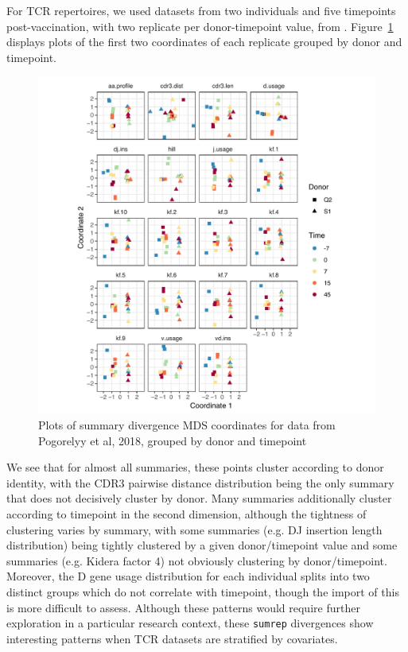 \documentclass{article}
\begin{document}
For TCR repertoires, we used datasets from two individuals and five timepoints post-vaccination, with two replicate per donor-timepoint value, from \cite{Pogorelyy2018-ak}.
Figure~\ref{fig:TCR_MDS} displays plots of the first two coordinates of each replicate grouped by donor and timepoint.
\begin{figure}
    \includegraphics[width=\linewidth]{Figures/tcr_pca.pdf}
    \caption{Plots of summary divergence MDS coordinates for data from Pogorelyy et al, 2018, grouped by donor and timepoint}
    \label{fig:TCR_MDS}
\end{figure}
We see that for almost all summaries, these points cluster according to donor identity, with the CDR3 pairwise distance distribution being the only summary that does not decisively cluster by donor.
Many summaries additionally cluster according to timepoint in the second dimension, although the tightness of clustering varies by summary, with some summaries (e.g. DJ insertion length distribution) being tightly clustered by a given donor/timepoint value and some summaries (e.g. Kidera factor 4) not obviously clustering by donor/timepoint.
Moreover, the D gene usage distribution for each individual splits into two distinct groups which do not correlate with timepoint, though the import of this is more difficult to assess.
Although these patterns would require further exploration in a particular research context, these \texttt{sumrep} divergences show interesting patterns when TCR datasets are stratified by covariates.
\end{document}

